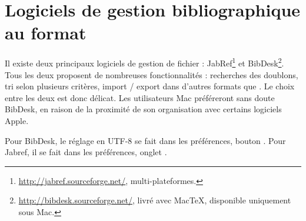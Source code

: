 \section{Logiciels de gestion bibliographique au format }\label{logicielbiblio}

Il existe deux principaux logiciels  de gestion de fichier  : JabRef\footnote{\url{http://jabref.sourceforge.net/}, multi-plateformes.} et BibDesk\footnote{\url{http://bibdesk.sourceforge.net/}, livré avec MacTeX, disponible uniquement sous Mac.}. Tous les deux proposent de nombreuses fonctionnalités : recherches des doublons,  tri selon plusieurs critères, import / export dans d'autres formats que . Le choix entre les deux est donc délicat.  Les utilisateurs Mac préféreront sans doute BibDesk, en raison de la proximité de son organisation avec certains logiciels Apple. 

Pour BibDesk, le réglage en UTF-8 se fait dans les préférences, bouton . Pour  Jabref, il se fait dans les préférences, onglet .


